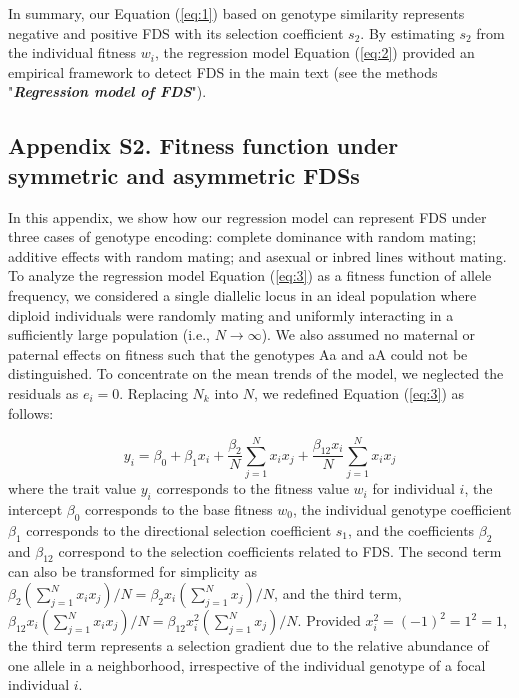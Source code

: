 \documentclass[12pt,]{article}
\begin{document}
In summary, our Equation (\ref{eq:1}) based on genotype similarity represents negative and positive FDS with its selection coefficient $s_2$. By estimating $s_2$ from the individual fitness $w_i$, the regression model Equation (\ref{eq:2}) provided an empirical framework to detect FDS in the main text (see the methods "\textit{\textbf{Regression model of FDS}}").

\newpage
\clearpage
\medskip
\subsection*{Appendix S2. Fitness function under symmetric and asymmetric FDSs}
In this appendix, we show how our regression model can represent FDS under three cases of genotype encoding: complete dominance with random mating; additive effects with random mating; and asexual or inbred lines without mating. To analyze the regression model Equation (\ref{eq:3}) as a fitness function of allele frequency, we considered a single diallelic locus in an ideal population where diploid individuals were randomly mating and uniformly interacting in a sufficiently large population (i.e., $N \to \infty$). We also assumed no maternal or paternal effects on fitness such that the genotypes Aa and aA could not be distinguished. To concentrate on the mean trends of the model, we neglected the residuals as $e_i = 0$. Replacing $N_{k}$ into $N$, we redefined Equation (\ref{eq:3}) as follows:

\begin{equation}
y_i = \beta_0 + \beta_1x_i + \frac{\beta_2}{N}\sum^{N}_{j=1}{x_ix_j} + \frac{\beta_{12}x_i}{N}\sum^{N}_{j=1}{x_ix_j} \label{eq:s4}
\end{equation}
\noindent
where the trait value $y_i$ corresponds to the fitness value $w_i$ for individual $i$, the intercept $\beta_0$ corresponds to the base fitness $w_0$, the individual genotype coefficient $\beta_1$ corresponds to the directional selection coefficient $s_1$, and the coefficients $\beta_2$ and $\beta_{12}$ correspond to the selection coefficients related to FDS. The second term can also be transformed for simplicity as $\beta_2(\sum^{N}_{j=1}x_i x_j)/N = \beta_2x_i(\sum^{N}_{j=1}x_j)/N$, and the third term, $\beta_{12}x_i(\sum^{N}_{j=1}x_i x_j)/N = \beta_{12}x^2_i(\sum^{N}_{j=1}x_j)/N$. Provided $x^2_i=(-1)^2=1^2=1$, the third term represents a selection gradient due to the relative abundance of one allele in a neighborhood, irrespective of the individual genotype of a focal individual $i$.
\end{document}
